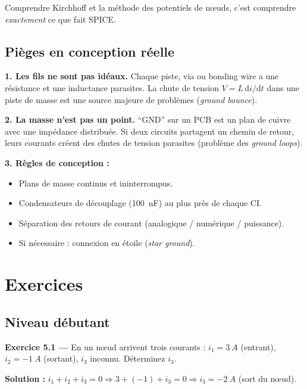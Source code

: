 \documentclass[12pt,a4paper,twoside]{book}
\begin{document}
Comprendre Kirchhoff et la méthode des potentiels de n\oe uds, c'est comprendre \textit{exactement} ce que fait SPICE.

\subsection{Pièges en conception réelle}

\begin{pratique}
\textbf{1. Les fils ne sont pas idéaux.} Chaque piste, via ou bonding wire a une résistance et une inductance parasites. La chute de tension $V = L\,\mathrm{d}i/\mathrm{d}t$ dans une piste de masse est une source majeure de problèmes (\textit{ground bounce}).

\textbf{2. La masse n'est pas un point.} ``GND'' sur un PCB est un plan de cuivre avec une impédance distribuée. Si deux circuits partagent un chemin de retour, leurs courants créent des chutes de tension parasites (problème des \textit{ground loops}).

\textbf{3. Règles de conception :}
\begin{itemize}[nosep]
\item Plans de masse continus et ininterrompus.
\item Condensateurs de découplage (\SI{100}{nF}) au plus près de chaque CI.
\item Séparation des retours de courant (analogique / numérique / puissance).
\item Si nécessaire : connexion en étoile (\textit{star ground}).
\end{itemize}
\end{pratique}

\section*{Exercices}

\subsection*{Niveau débutant}

\textbf{Exercice 5.1 ---} En un n\oe ud arrivent trois courants : $i_1 = \SI{3}{A}$ (entrant), $i_2 = \SI{-1}{A}$ (sortant), $i_3$ inconnu. Déterminez $i_3$.

\begin{pratique}
\textbf{Solution :} $i_1 + i_2 + i_3 = 0 \Rightarrow 3 + (-1) + i_3 = 0 \Rightarrow i_3 = \SI{-2}{A}$ (sort du n\oe ud).
\end{pratique}
\end{document}
